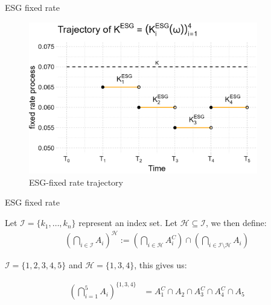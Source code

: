 \documentclass[UKenglish]{beamer}
\begin{document}
\begin{frame}{ESG fixed rate}
\begin{figure}[htp]
    \centering
    \includegraphics[width=10cm]{ESG/SBM_ESG_path.png}
    \caption{ESG-fixed rate trajectory}
    \label{fig: SBM_ESG_path}
\end{figure}
\end{frame}


\begin{frame}{ESG fixed rate}
\begin{notation}
Let $\mathcal{I} = \{k_{1}, \dots, k_{n}\}$ represent an index set. Let $\mathcal{H} 
\subseteq \mathcal{I}$, we then define: 
\begin{align*}
\left(
\bigcap_{i\in \mathcal{I}}A_{i}
\right)^{\mathcal{H}}
:= 
\left(
\bigcap_{i\in \mathcal{H}}A_{i}^{C}
\right)
\cap 
\left(
\bigcap_{i \in \mathcal{I}\setminus \mathcal{H}}A_{i}
\right)
\end{align*}
\end{notation}

\begin{example}
$\mathcal{I} = \{1,2,3,4,5\}$ and $\mathcal{H} = \{1,3,4\}$, this gives us: 

\begin{align*}
\left(
\bigcap_{i=1}^{5}A_{i}
\right)^{
\{1,3,4\}
}
&= 
A_{1}^{C}\cap A_{2}\cap A_{3}^{C}\cap A_{4}^{C}\cap A_{5}
\end{align*}    
\end{example}
\end{frame}
\end{document}

